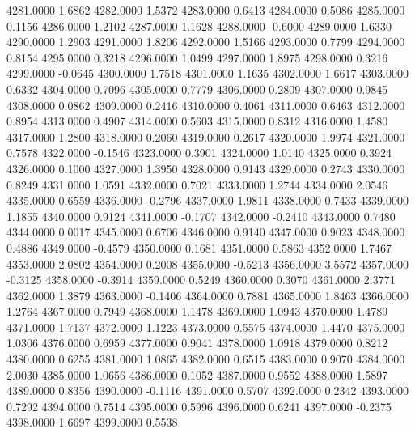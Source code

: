 4281.0000      1.6862
4282.0000      1.5372
4283.0000      0.6413
4284.0000      0.5086
4285.0000      0.1156
4286.0000      1.2102
4287.0000      1.1628
4288.0000     -0.6000
4289.0000      1.6330
4290.0000      1.2903
4291.0000      1.8206
4292.0000      1.5166
4293.0000      0.7799
4294.0000      0.8154
4295.0000      0.3218
4296.0000      1.0499
4297.0000      1.8975
4298.0000      0.3216
4299.0000     -0.0645
4300.0000      1.7518
4301.0000      1.1635
4302.0000      1.6617
4303.0000      0.6332
4304.0000      0.7096
4305.0000      0.7779
4306.0000      0.2809
4307.0000      0.9845
4308.0000      0.0862
4309.0000      0.2416
4310.0000      0.4061
4311.0000      0.6463
4312.0000      0.8954
4313.0000      0.4907
4314.0000      0.5603
4315.0000      0.8312
4316.0000      1.4580
4317.0000      1.2800
4318.0000      0.2060
4319.0000      0.2617
4320.0000      1.9974
4321.0000      0.7578
4322.0000     -0.1546
4323.0000      0.3901
4324.0000      1.0140
4325.0000      0.3924
4326.0000      0.1000
4327.0000      1.3950
4328.0000      0.9143
4329.0000      0.2743
4330.0000      0.8249
4331.0000      1.0591
4332.0000      0.7021
4333.0000      1.2744
4334.0000      2.0546
4335.0000      0.6559
4336.0000     -0.2796
4337.0000      1.9811
4338.0000      0.7433
4339.0000      1.1855
4340.0000      0.9124
4341.0000     -0.1707
4342.0000     -0.2410
4343.0000      0.7480
4344.0000      0.0017
4345.0000      0.6706
4346.0000      0.9140
4347.0000      0.9023
4348.0000      0.4886
4349.0000     -0.4579
4350.0000      0.1681
4351.0000      0.5863
4352.0000      1.7467
4353.0000      2.0802
4354.0000      0.2008
4355.0000     -0.5213
4356.0000      3.5572
4357.0000     -0.3125
4358.0000     -0.3914
4359.0000      0.5249
4360.0000      0.3070
4361.0000      2.3771
4362.0000      1.3879
4363.0000     -0.1406
4364.0000      0.7881
4365.0000      1.8463
4366.0000      1.2764
4367.0000      0.7949
4368.0000      1.1478
4369.0000      1.0943
4370.0000      1.4789
4371.0000      1.7137
4372.0000      1.1223
4373.0000      0.5575
4374.0000      1.4470
4375.0000      1.0306
4376.0000      0.6959
4377.0000      0.9041
4378.0000      1.0918
4379.0000      0.8212
4380.0000      0.6255
4381.0000      1.0865
4382.0000      0.6515
4383.0000      0.9070
4384.0000      2.0030
4385.0000      1.0656
4386.0000      0.1052
4387.0000      0.9552
4388.0000      1.5897
4389.0000      0.8356
4390.0000     -0.1116
4391.0000      0.5707
4392.0000      0.2342
4393.0000      0.7292
4394.0000      0.7514
4395.0000      0.5996
4396.0000      0.6241
4397.0000     -0.2375
4398.0000      1.6697
4399.0000      0.5538
